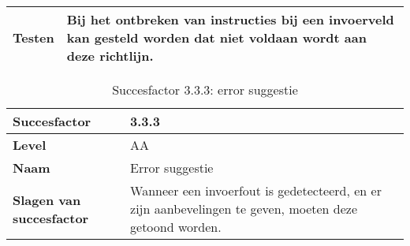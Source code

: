 \begin{table}[H]
\begin{tabular}{|l|p{12cm}|}
        \hline
        \textbf{Testen}                       & Bij het ontbreken van instructies bij een invoerveld kan gesteld worden dat niet voldaan wordt aan deze richtlijn.                      \\
        \hline
    \end{tabular}
    
\end{table}

\begin{table}[H]
    \centering
    \caption{Succesfactor 3.3.3: error suggestie}
    
    
    \hspace*{-1cm}\begin{tabular}{|l|p{12cm}|} 
        \hline
        \textbf{Succesfactor}                 & 3.3.3                                                                                                                                                                                                                                                                                                                                                                                                                                                                                                        \\ 
        \hline
        \textbf{Level}                        & AA                                                                                                                                                                                                                                                                                                                                                                                                                                                                                                               \\ 
        \hline
        \textbf{Naam}                         & Error suggestie~                                                                                                                                                                                                                                                                                                                                                                                                                                                                                      \\ 
        \hline
        \textbf{Slagen van succesfactor}      & Wanneer een invoerfout is gedetecteerd, en er zijn aanbevelingen te geven, moeten deze getoond worden.

\end{tabular}
\end{table}
